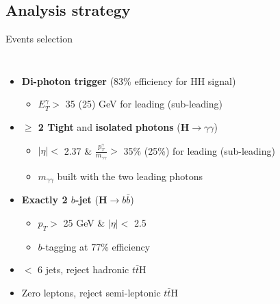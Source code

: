 \subsection{Analysis strategy}
\begin{frame}{Events selection}
\begin{columns}

\begin{itemize}
    \item \textbf{Di-photon trigger} (83\% efficiency for HH signal)
    \begin{itemize}
        \item $E_{T}^{\gamma} > $ 35 (25) GeV for leading (sub-leading)
    \end{itemize}
    \item \textbf{$\geq $ 2 Tight} and \textbf{isolated} \textbf{photons} (\textbf{\textcolor{HHturquoise_d}{H$\to\gamma\gamma$}})
    \begin{itemize}
        \item $|\eta|< $ 2.37 \& $\frac{p_{T}^{\gamma}}{m_{\gamma\gamma}} > $ 35\% (25\%) for leading (sub-leading)
        \item $m_{\gamma\gamma}$ built with the two leading photons
    \end{itemize}
    \item \textbf{Exactly 2 $b$-jet} (\textbf{\textcolor{HHred}{H$\to b\bar{b}$}})
    \begin{itemize}
        \item $p_{T} > $ 25 GeV \& $|\eta| < $ 2.5
        \item $b$-tagging at 77\% efficiency
    \end{itemize}
    \item $<$ 6 jets, reject hadronic $t\bar{t}$H
    \item Zero leptons, reject semi-leptonic $t\bar{t}$H
\end{itemize}



\end{columns}
\end{frame}
